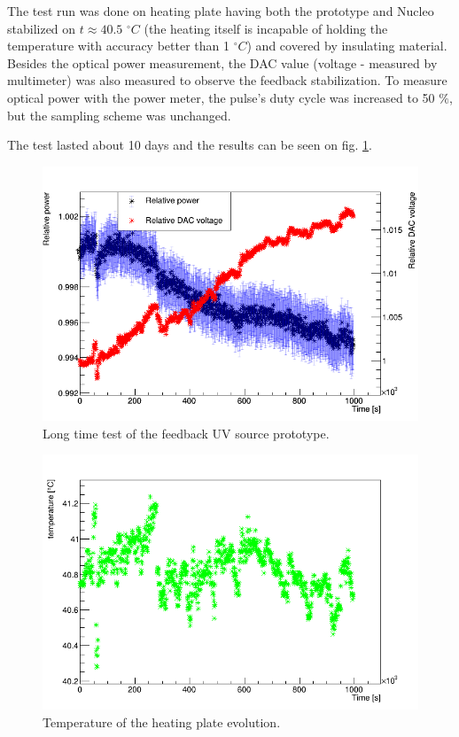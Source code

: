 \par
The test run was done on heating plate having both the prototype and Nucleo stabilized on $t \approx 40.5$ $^\circ C$ (the heating itself is incapable of holding the temperature with accuracy better than 1 $^\circ C$) and covered by insulating material. Besides the optical power measurement, the DAC value (voltage - measured by multimeter) was also measured to observe the feedback stabilization. To measure optical power with the power meter, the pulse's duty cycle was increased to 50 $\%$, but the sampling scheme was unchanged.

\par

The test lasted about 10 days and the results can be seen on fig. \ref{Long test}.


\begin{figure}[H]
 \centering
 \includegraphics[scale=0.5]{./pictures/LongTime.png}
 \caption{Long time test of the feedback UV source prototype.}
 \label{Long test}
\end{figure}

\begin{figure}[H]
 \centering
 \includegraphics[scale=0.5]{./pictures/LastTemp.png}
 \caption{Temperature of the heating plate evolution.}
 \label{Long test temperatures}
\end{figure}

